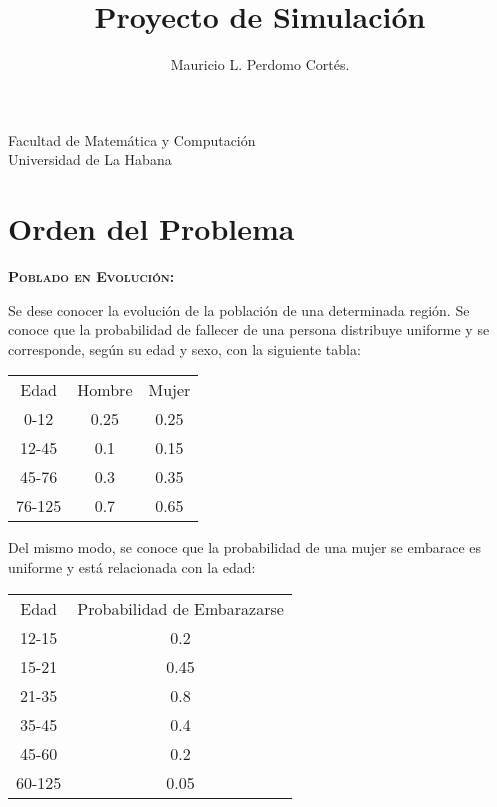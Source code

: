 \documentclass[12pt]{article}
\title{Proyecto de Simulaci\'on}
\author{Mauricio L. Perdomo Cort\'es.}
\begin{document}
\vspace{8.cm}

\maketitle

\begin{center}
    Facultad de Matem\'atica y Computaci\'on\\\vspace{0.2cm} Universidad de La Habana
\end{center}

\clearpage

\newpage

\section{Orden del Problema}
\centering
\textsc{\textbf{Poblado en Evoluci\'on:}}\\\vspace{1.cm}

Se dese conocer la evoluci\'on de la poblaci\'on de una determinada regi\'on.
Se conoce que la probabilidad de fallecer de una persona distribuye uniforme
y se corresponde, seg\'un su edad y sexo, con la siguiente tabla:

\begin{table}[htbp]
\begin{center}
\begin{tabular}{c c c }

Edad&Hombre&Mujer  \\
0-12&0.25&0.25 		\\
12-45& 0.1& 0.15  	\\
45-76& 0.3& 0.35    \\
76-125& 0.7& 0.65   \\
\end{tabular}
\end{center}
\end{table}
Del mismo modo, se conoce que la probabilidad de una mujer se embarace
es uniforme y est\'a relacionada con la edad:
\begin{table}[htbp]
	\begin{center}
		\begin{tabular}{c c }
			
			Edad&Probabilidad de Embarazarse \\
			12-15 &0.2		\\
			15-21 &0.45  	\\
			21-35 &0.8   \\
			35-45 &0.4  \\
			45-60 &0.2  \\
			60-125& 0.05  \\
		\end{tabular}
	\end{center}
\end{table}
\end{document}
